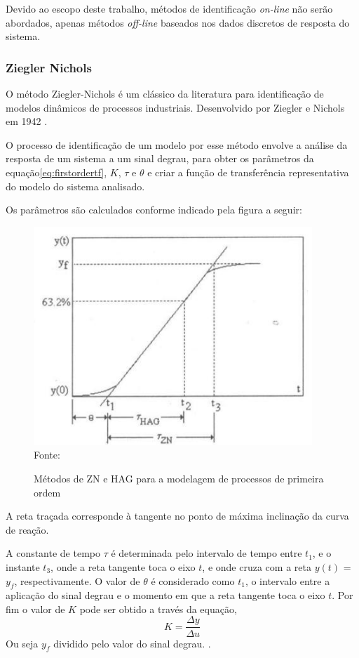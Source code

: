 Devido ao escopo deste trabalho, métodos de identificação \textit{on-line} não serão abordados, apenas métodos \textit{off-line} baseados
nos dados discretos de resposta do sistema.

\subsubsection{Ziegler Nichols}

O método Ziegler-Nichols é um clássico da literatura para identificação de modelos dinâmicos de
processos industriais.
Desenvolvido por Ziegler e Nichols em 1942 \cite[Cap 4]{CoelhoIdentificacao}.

O processo de identificação de um modelo por esse método envolve a análise da resposta de um sistema a um sinal
degrau, para obter os parâmetros da equação\eqref{eq:firstordertf}, $K$, $\tau$ e $\theta$ e criar
a função de transferência representativa do modelo do sistema analisado.

Os parâmetros são calculados conforme indicado pela figura a seguir:
    \begin{figure}[H]
    	\centering
    	\caption{Métodos de ZN e HAG para a modelagem de processos de primeira ordem}
    	\includegraphics[scale=1]{figuras/zn_hg_ident_meth}
    	\label{fig:zn_hg_ident_meth}
    	\\
        \vspace{0cm}\hspace{0cm}\small{Fonte: \cite[Fig 4.3]{CoelhoIdentificacao}}
    \end{figure}

A reta traçada corresponde à tangente no ponto de máxima inclinação da curva de reação.

A constante de tempo $\tau$ é determinada pelo intervalo de tempo entre $t_1$, e o instante
$t_3$, onde a reta tangente toca o eixo $t$, e onde cruza com a reta $y(t)$ = $y_f$,
respectivamente.
O valor de  $\theta$ é considerado como $t_1$, o intervalo entre a aplicação do sinal degrau e o
momento em que a reta tangente toca o eixo $t$.
Por fim o valor de $K$ pode ser obtido a través da equação,
\begin{equation}
\label{eq:dydu}
K = \frac{\Delta y}{\Delta u}
\end{equation}
Ou seja $y_f$ dividido pelo valor do sinal degrau. \cite[Cap 4]{CoelhoIdentificacao}.

